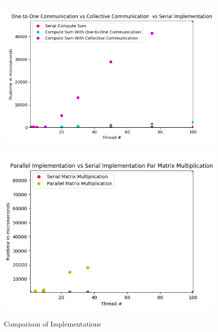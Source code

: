 \documentclass{article}
\begin{document}
\begin{figure}
\centering
\begin{minipage}{.5\textwidth}
  \centering
  \includegraphics[width=\linewidth]{assets/compute_sum.png}
  \label{fig:test1}
\end{minipage}%
\begin{minipage}{.5\textwidth}
  \centering
  \includegraphics[width=\linewidth]{assets/mm.png}
  \label{fig:test2}
\end{minipage}
\vspace{-2}
\caption{Comparison of Implementations}
\end{figure}
\end{document}
